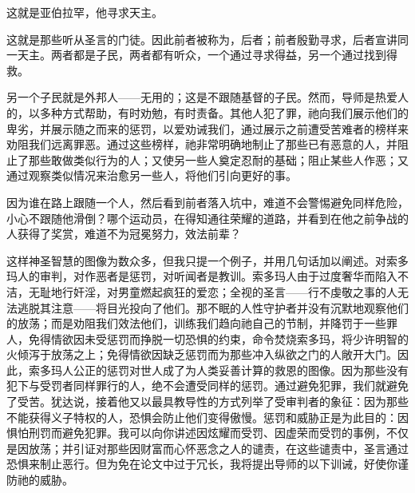 这就是亚伯拉罕，他寻求天主。\par

\par

这就是那些听从圣言的门徒。因此前者被称为，后者；前者殷勤寻求，后者宣讲同一天主。两者都是子民，两者都有听众，一个通过寻求得益，另一个通过找到得救。\par

\par

另一个子民就是外邦人——无用的；这是不跟随基督的子民。然而，导师是热爱人的，以多种方式帮助，有时劝勉，有时责备。其他人犯了罪，祂向我们展示他们的卑劣，并展示随之而来的惩罚，以爱劝诫我们，通过展示之前遭受苦难者的榜样来劝阻我们远离罪恶。通过这些榜样，祂非常明确地制止了那些已有恶意的人，并阻止了那些敢做类似行为的人；又使另一些人奠定忍耐的基础；阻止某些人作恶；又通过观察类似情况来治愈另一些人，将他们引向更好的事。\par

因为谁在路上跟随一个人，然后看到前者落入坑中，难道不会警惕避免同样危险，小心不跟随他滑倒？哪个运动员，在得知通往荣耀的道路，并看到在他之前争战的人获得了奖赏，难道不为冠冕努力，效法前辈？\par

这样神圣智慧的图像为数众多，但我只提一个例子，并用几句话加以阐述。对索多玛人的审判，对作恶者是惩罚，对听闻者是教训。索多玛人由于过度奢华而陷入不洁，无耻地行奸淫，对男童燃起疯狂的爱恋；全视的圣言——行不虔敬之事的人无法逃脱其注意——将目光投向了他们。那不眠的人性守护者并没有沉默地观察他们的放荡；而是劝阻我们效法他们，训练我们趋向祂自己的节制，并降罚于一些罪人，免得情欲因未受惩罚而挣脱一切恐惧的约束，命令焚烧索多玛，将少许明智的火倾泻于放荡之上；免得情欲因缺乏惩罚而为那些冲入纵欲之门的人敞开大门。因此，索多玛人公正的惩罚对世人成了为人类妥善计算的救恩的图像。因为那些没有犯下与受罚者同样罪行的人，绝不会遭受同样的惩罚。通过避免犯罪，我们就避免了受苦。犹达说，接着他又以最具教导性的方式列举了受审判者的象征：因为那些不能获得义子特权的人，恐惧会防止他们变得傲慢。惩罚和威胁正是为此目的：因惧怕刑罚而避免犯罪。我可以向你讲述因炫耀而受罚、因虚荣而受罚的事例，不仅是因放荡；并引证对那些因财富而心怀恶念之人的谴责，在这些谴责中，圣言通过恐惧来制止恶行。但为免在论文中过于冗长，我将提出导师的以下训诫，好使你谨防祂的威胁。\par

